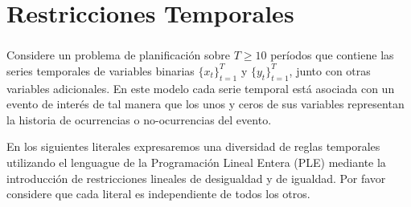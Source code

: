 \documentclass[ 10pt, xcolor = dvipsnames]{beamer}
\begin{document}
\section{Restricciones Temporales}

\begin{frame}[allowframebreaks]
\frametitle{\insertsection}

Considere un problema de planificaci\'on sobre $T \geq 10$ per\'iodos que contiene las series temporales de variables binarias $\{ x_t \}_{t=1}^T$ y $\{ y_t \}_{t=1}^T$, junto con otras variables adicionales. En este modelo cada serie temporal est\'a asociada con un evento de inter\'es de tal manera que los unos y ceros de sus variables representan la historia de ocurrencias o no-ocurrencias del evento. 

En los siguientes literales expresaremos una diversidad de reglas temporales utilizando el lenguague de la Programaci\'on Lineal Entera (PLE) mediante la introducci\'on de restricciones lineales de desigualdad y de igualdad. Por favor considere que cada literal es independiente de todos los otros. 

\end{frame}
\end{document}
